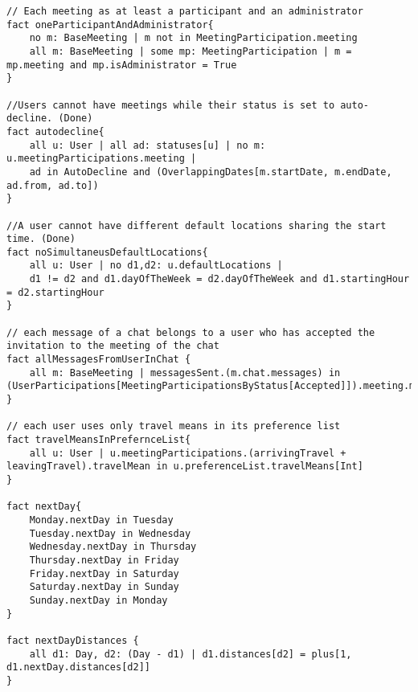 \begin{lstlisting}[style=alloy]
// Each meeting as at least a participant and an administrator
fact oneParticipantAndAdministrator{
	no m: BaseMeeting | m not in MeetingParticipation.meeting
	all m: BaseMeeting | some mp: MeetingParticipation | m = mp.meeting and mp.isAdministrator = True
}

//Users cannot have meetings while their status is set to auto-decline. (Done)
fact autodecline{
	all u: User | all ad: statuses[u] | no m: u.meetingParticipations.meeting | 
	ad in AutoDecline and (OverlappingDates[m.startDate, m.endDate, ad.from, ad.to])
}

//A user cannot have different default locations sharing the start time. (Done)
fact noSimultaneusDefaultLocations{
	all u: User | no d1,d2: u.defaultLocations | 
	d1 != d2 and d1.dayOfTheWeek = d2.dayOfTheWeek and d1.startingHour = d2.startingHour
}

// each message of a chat belongs to a user who has accepted the invitation to the meeting of the chat
fact allMessagesFromUserInChat {
	all m: BaseMeeting | messagesSent.(m.chat.messages) in  (UserParticipations[MeetingParticipationsByStatus[Accepted]]).meeting.m
}

// each user uses only travel means in its preference list
fact travelMeansInPrefernceList{
	all u: User | u.meetingParticipations.(arrivingTravel + leavingTravel).travelMean in u.preferenceList.travelMeans[Int]
}

fact nextDay{
	Monday.nextDay in Tuesday
	Tuesday.nextDay in Wednesday
	Wednesday.nextDay in Thursday
	Thursday.nextDay in Friday
	Friday.nextDay in Saturday
	Saturday.nextDay in Sunday
	Sunday.nextDay in Monday
}

fact nextDayDistances {
	all d1: Day, d2: (Day - d1) | d1.distances[d2] = plus[1, d1.nextDay.distances[d2]]
}

\end{lstlisting}
\vspace{0.5cm}